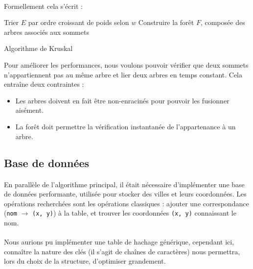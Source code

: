 \documentclass[a4paper]{article}
\begin{document}
\paragraph*{}
Formellement cela s'écrit :

\medskip

\begin{algorithm}[H]
\SetAlgoLined
{}
Trier $E$ par ordre croissant de poids selon $w$\;
Construire la forêt $F$, composée des arbres associés aux sommets\;
\caption{Algorithme de {\sc Kruskal}}
\end{algorithm}

\medskip

Pour améliorer les performances, nous voulons pouvoir vérifier que deux sommets n'appartiennent pas au même arbre et lier deux arbres en temps constant. Cela entraîne deux contraintes :
\begin{itemize}
\item Les arbres doivent en fait être non-enracinés pour pouvoir les fusionner aisément.
\item La forêt doit permettre la vérification instantanée de l'appartenance à un arbre.
\end{itemize}

\subsection{Base de données}

\paragraph*{}
En parallèle de l'algorithme principal, il était nécessaire d'implémenter une base de données performante, utilisée pour stocker des villes et leurs coordonnées. Les opérations recherchées sont les opérations classiques : ajouter une correspondance (\texttt{nom} $\rightarrow$ \texttt{(x, y)}) à la table, et trouver les coordonnées \texttt{(x, y)} connaissant le nom.

\paragraph*{}
Nous aurions pu implémenter une table de hachage générique, cependant ici, connaître la nature des clés (il s'agit de chaînes de caractères) nous permettra, lors du choix de la structure, d'optimiser grandement.
\end{document}
